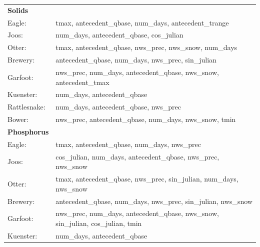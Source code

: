 \documentclass[10pt]{article}
\begin{document}
\begin{table}[h!]\small
    \begin{center}
    \begin{tabular}{ll}
        \textbf{Solids} & \\
        \hspace{5mm} Eagle: & tmax, antecedent\_qbase, num\_days, antecedent\_trange\\
        \hspace{5mm} Joos: & num\_days, antecedent\_qbase, cos\_julian\\
        \hspace{5mm} Otter: & tmax, antecedent\_qbase, nws\_prec, nws\_snow, num\_days\\
        \hspace{5mm} Brewery: & antecedent\_qbase, num\_days, nws\_prec, sin\_julian\\
        \hspace{5mm} Garfoot: & nws\_prec, num\_days, antecedent\_qbase, nws\_snow, antecedent\_tmax\\
        \hspace{5mm} Kuenster: & num\_days, antecedent\_qbase\\
        \hspace{5mm} Rattlesnake: & num\_days, antecedent\_qbase, nws\_prec \\
        \hspace{5mm} Bower: & nws\_prec, antecedent\_qbase, num\_days, nws\_snow, tmin
    \vspace{2mm}\\
        \textbf{Phosphorus} & \\
        \hspace{5mm} Eagle: & tmax, antecedent\_qbase, num\_days, nws\_prec\\
        \hspace{5mm} Joos: & cos\_julian, num\_days, antecedent\_qbase, nws\_prec, nws\_snow\\
        \hspace{5mm} Otter: & tmax, antecedent\_qbase, nws\_prec, sin\_julian, num\_days, nws\_snow\\
        \hspace{5mm} Brewery: & antecedent\_qbase, num\_days, nws\_prec, sin\_julian, nws\_snow\\
        \hspace{5mm} Garfoot: & nws\_prec, num\_days, antecedent\_qbase, nws\_snow, sin\_julian, cos\_julian, tmin\\
        \hspace{5mm} Kuenster: & num\_days, antecedent\_qbase\\

\end{tabular}
\end{center}
\end{table}
\end{document}
